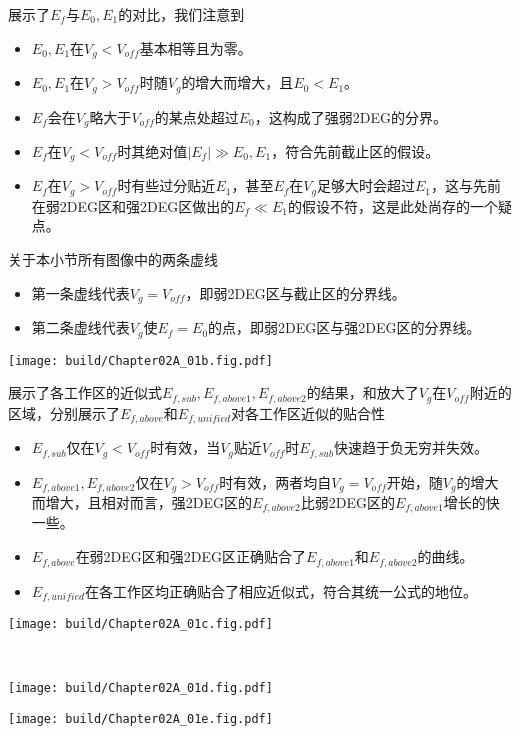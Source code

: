 展示了$E_f$与$E_0,E_1$的对比，我们注意到

\begin{itemize}
    \item $E_0,E_1$在$V_g<V_{off}$基本相等且为零。
    \item $E_0,E_1$在$V_g>V_{off}$时随$V_g$的增大而增大，且$E_0<E_1$。
    \item $E_f$会在$V_g$略大于$V_{off}$的某点处超过$E_0$，这构成了强弱2DEG的分界。
    \item $E_f$在$V_g<V_{off}$时其绝对值$|E_f|\gg E_0,E_1$，符合先前截止区的假设。
    \item $E_f$在$V_g>V_{off}$时有些过分贴近$E_1$，甚至$E_f$在$V_g$足够大时会超过$E_1$，这与先前在弱2DEG区和强2DEG区做出的$E_f\ll E_1$的假设不符，这是此处尚存的一个疑点。
\end{itemize}
关于本小节所有图像中的两条虚线
\begin{itemize}
    \item 第一条虚线代表$V_g=V_{off}$，即弱2DEG区与截止区的分界线。
    \item 第二条虚线代表$V_g$使$E_f=E_0$的点，即弱2DEG区与强2DEG区的分界线。
\end{itemize}
\begin{Figure}[电子本征能级与费米能级的对比]
    \texttt{[image: build/Chapter02A\_01b.fig.pdf]}
\end{Figure}\goodbreak

展示了各工作区的近似式$E_{f,sub},E_{f,above1},E_{f,above2}$的结果，和放大了$V_g$在$V_{off}$附近的区域，分别展示了$E_{f,above}$和$E_{f,unified}$对各工作区近似的贴合性
\begin{itemize}
    \item $E_{f,sub}$仅在$V_g<V_{off}$时有效，当$V_g$贴近$V_{off}$时$E_{f,sub}$快速趋于负无穷并失效。
    \item $E_{f,above1},E_{f,above2}$仅在$V_g>V_{off}$时有效，两者均自$V_g=V_{off}$开始，随$V_{g}$的增大而增大，且相对而言，强2DEG区的$E_{f,above2}$比弱2DEG区的$E_{f,above1}$增长的快一些。
    \item $E_{f,above}$在弱2DEG区和强2DEG区正确贴合了$E_{f,above1}$和$E_{f,above2}$的曲线。
    \item $E_{f,unified}$在各工作区均正确贴合了相应近似式，符合其统一公式的地位。
\end{itemize}
\begin{Figure}[费米能级各近似式]
    \begin{FigureSub}[各近似式的全览]
        \texttt{[image: build/Chapter02A\_01c.fig.pdf]}
    \end{FigureSub}\\ \vspace{0.25cm}
    \begin{FigureSub}
        \texttt{[image: build/Chapter02A\_01d.fig.pdf]}
    \end{FigureSub}
    \begin{FigureSub}
        \texttt{[image: build/Chapter02A\_01e.fig.pdf]}
    \end{FigureSub}
\end{Figure}
